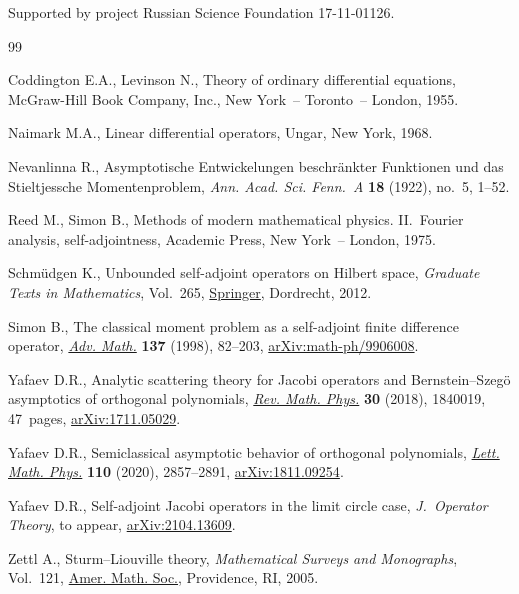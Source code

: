 \documentclass[pdftex]{sigma}%
\numberwithin{equation}{section}
\begin{document}
 Supported by project Russian Science Foundation 17-11-01126.

\begin{thebibliography}{99}
\footnotesize\itemsep=0pt

Coddington E.A., Levinson N., Theory of ordinary differential equations,
 McGraw-Hill Book Company, Inc., New York~-- Toronto~-- London, 1955.

Naimark M.A., Linear differential operators, Ungar, New York, 1968.

Nevanlinna R., Asymptotische Entwickelungen beschr\"ankter Funktionen und das
 Stieltjessche Momentenproblem, \textit{Ann. Acad. Sci. Fenn.~A} \textbf{18}
 (1922), no.~5, 1--52.

Reed M., Simon B., Methods of modern mathematical physics. {II}.~Fourier
 analysis, self-adjointness, Academic Press, New York~-- London, 1975.

Schm\"udgen K., Unbounded self-adjoint operators on {H}ilbert space,
 \textit{Graduate Texts in Mathematics}, Vol.~265, \href{https://doi.org/10.1007/978-94-007-4753-1}{Springer}, Dordrecht, 2012.

Simon B., The classical moment problem as a self-adjoint finite difference
 operator, \href{https://doi.org/10.1006/aima.1998.1728}{\textit{Adv. Math.}} \textbf{137} (1998), 82--203,
 \href{https://arxiv.org/abs/math-ph/9906008}{arXiv:math-ph/9906008}.

Yafaev D.R., Analytic scattering theory for {J}acobi operators and
 {B}ernstein--{S}zeg\"{o} asymptotics of orthogonal polynomials, \href{https://doi.org/10.1142/S0129055X18400196}{\textit{Rev.
 Math. Phys.}} \textbf{30} (2018), 1840019, 47~pages, \href{https://arxiv.org/abs/1711.05029}{arXiv:1711.05029}.

Yafaev D.R., Semiclassical asymptotic behavior of orthogonal polynomials,
 \href{https://doi.org/10.1007/s11005-020-01313-w}{\textit{Lett. Math. Phys.}} \textbf{110} (2020), 2857--2891,
 \href{https://arxiv.org/abs/1811.09254}{arXiv:1811.09254}.

Yafaev D.R., Self-adjoint {J}acobi operators in the limit circle case,
 \textit{J.~Operator Theory}, {t}o appear, \href{https://arxiv.org/abs/2104.13609}{arXiv:2104.13609}.

Zettl A., Sturm--{L}iouville theory, \textit{Mathematical Surveys and
 Monographs}, Vol.~121, \href{https://doi.org/10.1090/surv/121}{Amer. Math. Soc.}, Pro\-vidence, RI, 2005.

\end{thebibliography}\LastPageEnding
\end{document}
